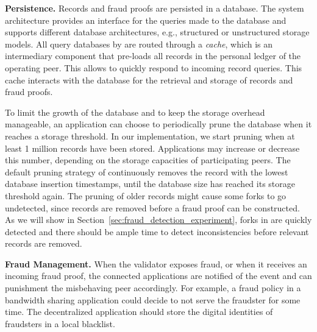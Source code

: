 
\textbf{Persistence.}
Records and fraud proofs are persisted in a database.
The \ModelName{} system architecture provides an interface for the queries made to the database and supports different database architectures, e.g., structured or unstructured storage models.
All query databases by \ModelName{} are routed through a \emph{cache}, which is an intermediary component that pre-loads all records in the personal ledger of the operating peer.
This allows \ModelName{} to quickly respond to incoming record queries.
This cache interacts with the database for the retrieval and storage of records and fraud proofs.

To limit the growth of the database and to keep the storage overhead manageable, an application can choose to periodically prune the database when it reaches a storage threshold.
In our implementation, we start pruning when at least 1 million records have been stored.
Applications may increase or decrease this number, depending on the storage capacities of participating peers.
The default pruning strategy of \ModelName{} continuously removes the record with the lowest database insertion timestamps, until the database size has reached its storage threshold again.
The pruning of older records might cause some forks to go undetected, since records are removed before a fraud proof can be constructed.
As we will show in Section~\ref{sec:fraud_detection_experiment}, forks in \ModelName{} are quickly detected and there should be ample time to detect inconsistencies before relevant records are removed.

\textbf{Fraud Management.}
When the validator exposes fraud, or when it receives an incoming fraud proof, the connected applications are notified of the event and can punishment the misbehaving peer accordingly.
For example, a fraud policy in a bandwidth sharing application could decide to not serve the fraudster for some time.
The decentralized application should store the digital identities of fraudsters in a local blacklist.

